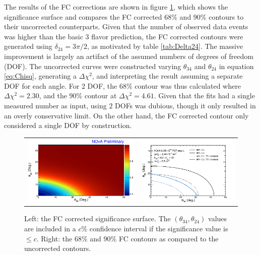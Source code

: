 The results of the FC corrections are shown in figure \ref{fig:Fit2DFC}, which shows the significance surface and compares the FC corrected $68\%$ and $90\%$ contours to their uncorrected counterparts. Given that the number of observed data events was higher than the basic $3$ flavor prediction, the FC corrected contours were generated using $\delta_{24} = 3\pi/2$, as motivated by table \ref{tab:Delta24}. The massive improvement is largely an artifact of the assumed numbers of degrees of freedom (DOF). The uncorrected curves were constructed varying $\theta_{34}$ and $\theta_{24}$ in equation \ref{eq:Chisq}, generating a $\Delta\chi^2$, and interpreting the result assuming a separate DOF for each angle. For $2$ DOF, the $68\%$ contour was thus calculated where $\Delta\chi^2 = 2.30$, and the $90\%$ contour at $\Delta\chi^2 = 4.61$. Given that the fits had a single measured number as input, using $2$ DOFs was dubious, though it only resulted in an overly conservative limit. On the other hand, the FC corrected contour only considered a single DOF by construction.
\begin{figure}[htbp]
  \centering
  \begin{tabular}{c c}
    \includegraphics[width=.47\textwidth]{figures/Fits/cFCSigD243Pi2.png} &
    \includegraphics[width=.47\textwidth]{figures/Fits/2D3424FCD243Pi2.png} \\
  \end{tabular}
  \caption[FC Corrected Significance Surface and $68\%$ and $90\%$ Contours]{Left: the FC corrected significance surface. The $(\theta_{34}, \theta_{24})$ values are included in a $c\%$ confidence interval if the significance value is $\leq c$. Right: the $68\%$ and $90\%$ FC contours as compared to the uncorrected contours.}
  \label{fig:Fit2DFC}
\end{figure}

